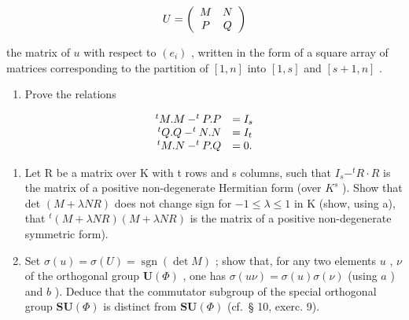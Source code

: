 \[
U = \left( \begin{array}{c c} M & N \\ P & Q \end{array} \right)
\]

the matrix of \(u\) with respect to \((e_{i})\) , written in the form of a square array of matrices corresponding to the partition of \([1, n]\) into \([1, s]\) and \([s + 1, n]\) .

\begin{enumerate}
\def\labelenumi{\alph{enumi})}
\tightlist
\item
  Prove the relations
\end{enumerate}

\[
\begin{array}{r l} ^ {t} M. M - ^ {t} P. P & = I _ {s} \\ ^ {t} Q. Q - ^ {t} N. N & = I _ {t} \\ ^ {t} M. N - ^ {t} P. Q & = 0. \end{array}
\]

\begin{enumerate}
\def\labelenumi{\alph{enumi})}
\setcounter{enumi}{1}
\item
  Let R be a matrix over K with t rows and s columns, such that \(I_{s} - ^{t}R \cdot R\) is the matrix of a positive non-degenerate Hermitian form (over \(K^{s}\) ). Show that det \((M + \lambda NR)\) does not change sign for \(-1 \leqslant \lambda \leqslant 1\) in K (show, using a), that \(^{t}(M + \lambda NR)(M + \lambda NR)\) is the matrix of a positive non-degenerate symmetric form).
\item
  Set \(\sigma(u) = \sigma(U) = \operatorname{sgn}(\det M)\) ; show that, for any two elements \(u\) , \(\nu\) of the orthogonal group \(\mathbf{U}(\Phi)\) , one has \(\sigma(u\nu) = \sigma(u)\sigma(\nu)\) (using \(a\) ) and \(b\) ). Deduce that the commutator subgroup of the special orthogonal group \(\mathbf{SU}(\Phi)\) is distinct from \(\mathbf{SU}(\Phi)\) (cf.~§ 10, exerc. 9).
\end{enumerate}

